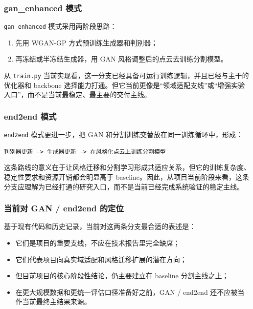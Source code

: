 \documentclass[12pt]{ctexart}
\begin{document}
\subsubsection{gan\_enhanced 模式}

\texttt{gan\_enhanced} 模式采用两阶段思路：

\begin{enumerate}
  \item 先用 WGAN-GP 方式预训练生成器和判别器；
  \item 再冻结或半冻结生成器，用 GAN 风格调整后的点云去训练分割模型。
\end{enumerate}

从 \texttt{train.py} 当前实现看，这一分支已经具备可运行训练逻辑，并且已经与主干的优化器和 backbone 选择能力打通。但它当前更像是“领域适配支线”或“增强实验入口”，而不是当前最稳定、最主要的交付主线。

\subsubsection{end2end 模式}

\texttt{end2end} 模式更进一步，把 GAN 和分割训练交替放在同一训练循环中，形成：

\begin{center}
\texttt{判别器更新 -> 生成器更新 -> 在风格化点云上训练分割模型}
\end{center}

这条路线的意义在于让风格迁移和分割学习形成共适应关系，但它的训练复杂度、稳定性要求和资源开销都会明显高于 baseline。因此，从项目当前阶段来看，这条分支应理解为已经打通的研究入口，而不是当前已经完成系统验证的稳定主线。

\subsubsection{当前对 GAN / end2end 的定位}

基于现有代码和历史记录，当前对这两条分支最合适的表述是：

\begin{itemize}
  \item 它们是项目的重要支线，不应在技术报告里完全缺席；
  \item 它们代表项目向真实域适配和风格迁移扩展的潜在方向；
  \item 但目前项目的核心阶段性结论，仍主要建立在 baseline 分割主线之上；
  \item 在更大规模数据和更统一评估口径准备好之前，GAN / end2end 还不应被当作当前最终主结果来源。
\end{itemize}
\end{document}
